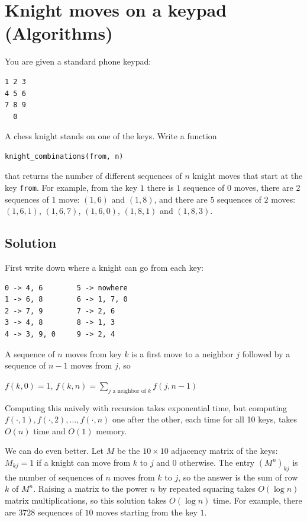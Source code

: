 \section {Knight moves on a keypad (Algorithms)}

You are given a standard phone keypad:

\begin{verbatim}
1 2 3
4 5 6
7 8 9
  0
\end{verbatim}

A chess knight stands on one of the keys. Write a function

\begin{verbatim}
knight_combinations(from, n)
\end{verbatim}

that returns the number of different sequences of $n$ knight moves that start at the key \verb|from|.
For example, from the key $1$ there is $1$ sequence of $0$ moves, there are $2$ sequences of $1$ move: $(1,6)$ and $(1,8)$,
and there are $5$ sequences of $2$ moves: $(1,6,1)$, $(1,6,7)$, $(1,6,0)$, $(1,8,1)$ and $(1,8,3)$.

\subsection{Solution}

First write down where a knight can go from each key:

\begin{verbatim}
0 -> 4, 6        5 -> nowhere
1 -> 6, 8        6 -> 1, 7, 0
2 -> 7, 9        7 -> 2, 6
3 -> 4, 8        8 -> 1, 3
4 -> 3, 9, 0     9 -> 2, 4
\end{verbatim}

A sequence of $n$ moves from key $k$ is a first move to a neighbor $j$ followed by a sequence of $n-1$ moves from $j$, so
\begin{center}
$f(k, 0) = 1$, \quad $f(k, n) = \sum_{j \text{ a neighbor of } k} f(j, n-1)$
\end{center}
Computing this naively with recursion takes exponential time, but computing $f(\cdot, 1), f(\cdot, 2), \ldots, f(\cdot, n)$ one after the other,
each time for all 10 keys, takes $O(n)$ time and $O(1)$ memory.

We can do even better. Let $M$ be the $10 \times 10$ adjacency matrix of the keys: $M_{kj} = 1$ if a knight can move from $k$ to $j$ and $0$ otherwise.
The entry $(M^n)_{kj}$ is the number of sequences of $n$ moves from $k$ to $j$, so the answer is the sum of row $k$ of $M^n$.
Raising a matrix to the power $n$ by repeated squaring takes $O(\log n)$ matrix multiplications, so this solution takes $O(\log n)$ time.
For example, there are $3728$ sequences of $10$ moves starting from the key $1$.
